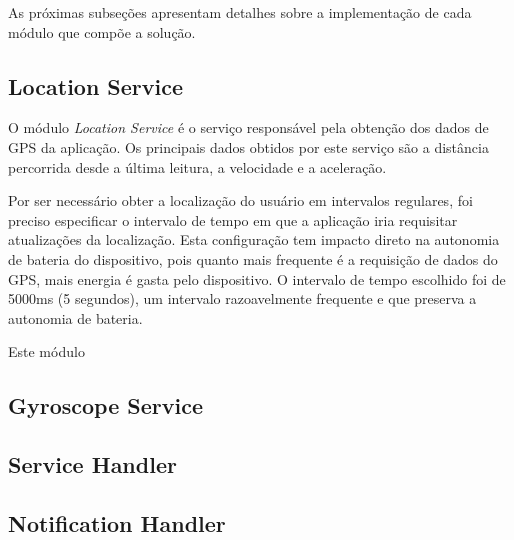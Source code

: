 As próximas subseções apresentam detalhes sobre a implementação de cada módulo que compõe a solução.

\subsection{Location Service}
\label{location-service}

O módulo \textit{Location Service} é o serviço responsável pela obtenção dos dados de GPS da aplicação. Os principais dados obtidos
por este serviço são a distância percorrida desde a última leitura, a velocidade e a aceleração.

Por ser necessário obter a localização do usuário em intervalos regulares, foi preciso especificar o intervalo de tempo em que a
aplicação iria requisitar atualizações da localização. Esta configuração tem impacto direto na autonomia de bateria do dispositivo,
pois quanto mais frequente é a requisição de dados do GPS, mais energia é gasta pelo dispositivo. O intervalo de tempo escolhido
foi de 5000ms (5 segundos), um intervalo razoavelmente frequente e que preserva a autonomia de bateria.

Este módulo 

\subsection{Gyroscope Service}
\label{gyroscope-service}

\subsection{Service Handler}
\label{service-handler}

\subsection{Notification Handler}
\label{notification-handler}
